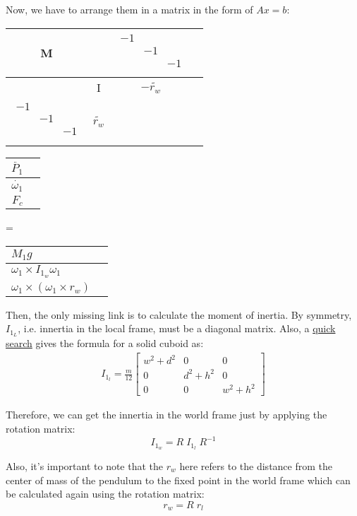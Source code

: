\documentclass[a4paper,11pt]{article}
\begin{document}
Now, we have to arrange them in a matrix in the form of $Ax = b$:
\begin{tabular}{|C|C|C|N}
  \hline
  M & & $\begin{array}{DDD} -1 &  &  \\[.4cm]  & -1 &  \\[.4cm]  &  & -1 \\[.4cm] \end{array}$ & \\[2.2cm]
  \hline
   & I & $-\widetilde{r_w}$ & \\[2.2cm]
  \hline
  $\begin{array}{DDD} -1 &  &  \\[.4cm]  & -1 &  \\[.4cm]  &  & -1 \\[.4cm] \end{array}$ & $\widetilde{r_w}$ & & \\[2.2cm]
  \hline
\end{tabular}
\begin{tabular}{|D|N}
  \hline
  $\ddot{P_1}$ &\\[2.2cm]
  \hline
  $\dot{\omega_1}$ &\\[2.2cm]
  \hline
  $F_c$ &\\[2.2cm]
  \hline
\end{tabular}
=
\begin{tabular}{|E|N}
  \hline
  $M_1 g$ &\\[2.2cm]
  \hline
  $\omega_1 \times I_{1_w} \omega_1$ &\\[2.2cm]
  \hline
  $\omega_1 \times (\omega_1 \times r_w)$ &\\[2.2cm]
  \hline
\end{tabular}

\vspace{6mm}
Then, the only missing link is to calculate the moment of inertia. By symmetry, $I_{1_L}$, i.e. innertia in the local frame, must be a diagonal matrix. Also, a \href{https://en.wikipedia.org/wiki/List_of_moments_of_inertia}{quick search} gives the formula for a solid cuboid as:
\begin{align*}
  I_{1_l} = \frac{m}{12}\begin{bmatrix}w^2 + d^2 & 0 & 0\\ 0 & d^2 + h^2 & 0\\ 0 & 0 & w^2+h^2\end{bmatrix}
\end{align*}

Therefore, we can get the innertia in the world frame just by applying the rotation matrix:
$$I_{1_w} = R \; I_{1_l} \; R^{-1}$$

Also, it's important to note that the $r_w$ here refers to the distance from the center of mass of the pendulum to the fixed point in the world frame which can be calculated again using the rotation matrix:
$$ r_w = R \;r_l $$
\end{document}
